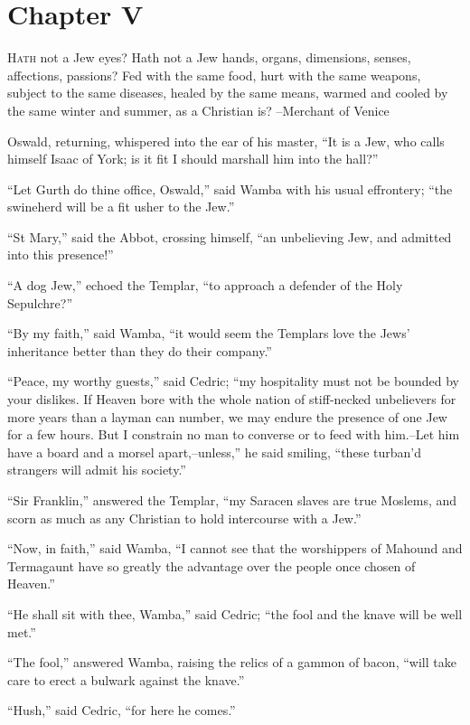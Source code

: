 \chapter{Chapter V}

\lettrine{H}{ath} not a Jew eyes? Hath not a Jew hands, organs,
dimensions, senses,
affections, passions? Fed with the same food, hurt with the same
weapons, subject to the same diseases, healed by the same means, warmed
and cooled by the same winter and summer, as a Christian is? --Merchant
of Venice

Oswald, returning, whispered into the ear of his master, ``It is a Jew,
who calls himself Isaac of York; is it fit I should marshall him into
the hall?''

``Let Gurth do thine office, Oswald,'' said Wamba with his usual
effrontery; ``the swineherd will be a fit usher to the Jew.''

``St Mary,'' said the Abbot, crossing himself, ``an unbelieving Jew, and
admitted into this presence!''

``A dog Jew,'' echoed the Templar, ``to approach a defender of the Holy
Sepulchre?''

``By my faith,'' said Wamba, ``it would seem the Templars love the Jews'
inheritance better than they do their company.''

``Peace, my worthy guests,'' said Cedric; ``my hospitality must not be
bounded by your dislikes. If Heaven bore with the whole nation of
stiff-necked unbelievers for more years than a layman can number, we may
endure the presence of one Jew for a few hours. But I constrain no man
to converse or to feed with him.--Let him have a board and a morsel
apart,--unless,'' he said smiling, ``these turban'd strangers will admit
his society.''

``Sir Franklin,'' answered the Templar, ``my Saracen slaves are true
Moslems, and scorn as much as any Christian to hold intercourse with a
Jew.''

``Now, in faith,'' said Wamba, ``I cannot see that the worshippers of
Mahound and Termagaunt have so greatly the advantage over the people
once chosen of Heaven.''

``He shall sit with thee, Wamba,'' said Cedric; ``the fool and the knave
will be well met.''

``The fool,'' answered Wamba, raising the relics of a gammon of bacon,
``will take care to erect a bulwark against the knave.''

``Hush,'' said Cedric, ``for here he comes.''

